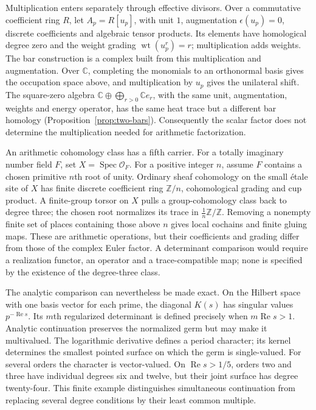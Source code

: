 Multiplication enters separately through effective divisors. Over a
commutative coefficient ring $R$, let $A_p=R[u_p]$, with unit $1$,
augmentation $\epsilon(u_p)=0$, discrete coefficients and algebraic
tensor products. Its elements have homological degree zero and the
weight grading $\operatorname{wt}(u_p^r)=r$; multiplication adds weights.
The bar construction is a complex built from this multiplication and
augmentation. Over $\mathbb C$, completing the monomials to an
orthonormal basis gives the occupation space above, and multiplication
by $u_p$ gives the unilateral shift. The square-zero algebra
$\mathbb C\oplus\bigoplus_{r>0}\mathbb C e_r$, with the same unit,
augmentation, weights and energy operator, has the same heat trace
but a different bar homology (Proposition~\ref{prop:two-bars}).
Consequently the scalar factor does not determine the multiplication
needed for arithmetic factorization.

An arithmetic cohomology class has a fifth carrier. For a totally
imaginary number field $F$, set $X=\operatorname{Spec}\mathcal O_F$.
For a positive integer $n$, assume $F$ contains a chosen primitive
$n$th root of unity. Ordinary sheaf cohomology on the small \'etale
site of $X$ has finite discrete coefficient ring $\mathbb Z/n$,
cohomological grading and cup product. A finite-group torsor on $X$
pulls a group-cohomology class back to degree three; the chosen root
normalizes its trace in $\tfrac1n\mathbb Z/\mathbb Z$. Removing a
nonempty finite set of places containing those above $n$ gives local
cochains and finite gluing maps. These are arithmetic operations, but
their coefficients and grading differ from those of the complex
Euler factor. A determinant comparison would require a realization
functor, an operator and a trace-compatible map; none is specified by
the existence of the degree-three class.

The analytic comparison can nevertheless be made exact. On the Hilbert
space with one basis vector for each prime, the diagonal $K(s)$ has
singular values $p^{-\operatorname{Re}s}$. Its $m$th regularized
determinant is defined precisely when $m\operatorname{Re}s>1$.
Analytic continuation preserves the normalized germ but may make it
multivalued. The logarithmic derivative defines a period character;
its kernel determines the smallest pointed surface on which the germ
is single-valued. For several orders the character is vector-valued.
On $\operatorname{Re}s>1/5$, orders two and three have individual
degrees six and twelve, but their joint surface has degree twenty-four.
This finite example distinguishes simultaneous continuation from
replacing several degree conditions by their least common multiple.

